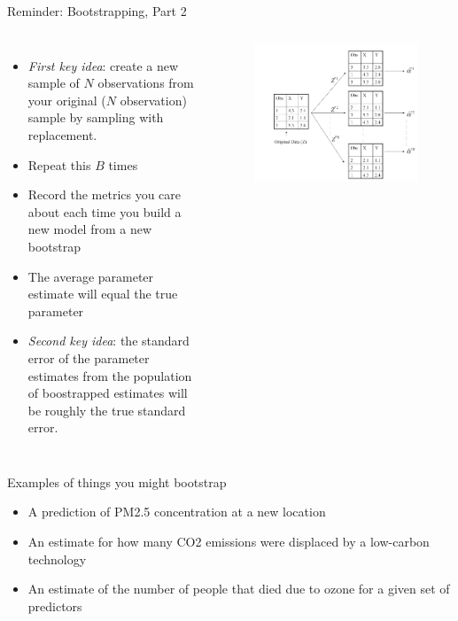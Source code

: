 \documentclass[mathserif, aspectratio=169]{beamer}
\begin{document}
\begin{frame}{Reminder: Bootstrapping, Part 2}

\begin{columns}

\begin{itemize}
\item \textit{First key idea}: create a new sample of $N$ observations from your original ($N$ observation) sample by sampling with replacement.
\item Repeat this $B$ times
\item Record the metrics you care about each time you build a new model from a new bootstrap
\item The average parameter estimate will equal the true parameter
\item \textit{Second key idea}:  the standard error of the parameter estimates from the population of boostrapped estimates will be roughly the true standard error.
\end{itemize}
\begin{figure}
\includegraphics[width=\textwidth]{bootstrap}
\caption*{}
\end{figure}
\end{columns}
\end{frame}

\begin{frame}{Examples of things you might bootstrap}
\begin{itemize}
 \item A prediction of PM2.5 concentration at a new location
 \item An estimate for how many CO2 emissions were displaced by a low-carbon technology
 \item An estimate of the number of people that died due to ozone for a given set of predictors
 \end{itemize} 
\end{frame}
\end{document}
